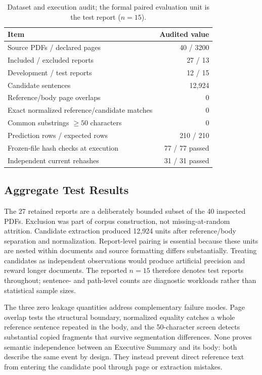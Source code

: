 \documentclass[applsci,article,submit,moreauthors]{Definitions/mdpi}
\begin{document}
\begin{table}[H]
\caption{Dataset and execution audit; the formal paired evaluation unit is the test report ($n=15$).}
\label{tab:audit}\centering
\begin{tabular}{lr}
\toprule
Item & Audited value\\
\midrule
Source PDFs / declared pages & 40 / 3200\\
Included / excluded reports & 27 / 13\\
Development / test reports & 12 / 15\\
Candidate sentences & 12,924\\
Reference/body page overlaps & 0\\
Exact normalized reference/candidate matches & 0\\
Common substrings $\geq50$ characters & 0\\
Prediction rows / expected rows & 210 / 210\\
Frozen-file hash checks at execution & 77 / 77 passed\\
Independent current rehashes & 31 / 31 passed\\
\bottomrule
\end{tabular}
\end{table}

\subsection{Aggregate Test Results}

The 27 retained reports are a deliberately bounded subset of the 40 inspected PDFs. Exclusion was part of corpus construction, not missing-at-random attrition. Candidate extraction produced 12,924 units after reference/body separation and normalization. Report-level pairing is essential because these units are nested within documents and source formatting differs substantially. Treating candidates as independent observations would produce artificial precision and reward longer documents. The reported $n=15$ therefore denotes test reports throughout; sentence- and path-level counts are diagnostic workloads rather than statistical sample sizes.

The three zero leakage quantities address complementary failure modes. Page overlap tests the structural boundary, normalized equality catches a whole reference sentence repeated in the body, and the 50-character screen detects substantial copied fragments that survive segmentation differences. None proves semantic independence between an Executive Summary and its body: both describe the same event by design. They instead prevent direct reference text from entering the candidate pool through page or extraction mistakes.
\end{document}
